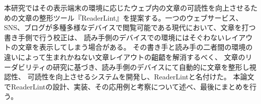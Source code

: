 \begin{jabstract}

	本研究ではその表示端末の環境に応じたウェブ内の文章の可読性を向上させるための文章の整形ツール『ReaderLint』を提案する。一つのウェブサービス、SNS、ブログが多種多様なデバイスで閲覧可能である現代において、文章を打つ書き手側で行う校正は、
    読み手側のデバイスでの環境にはそぐわないレイアウトの文章を表示してしまう場合がある。
    その書き手と読み手の二者間の環境の違いによって生まれかねない文章レイアウトの齟齬を解消するべく、
    文章のリーダビリティの研究に基づき、読み手側のデバイスにて自動的に文章を整形し視認性、
    可読性を向上させるシステムを開発し、ReaderLintと名付けた。
	本論文でReaderLintの設計、実装、その応用例と考察について述べ、最後にまとめを行う。

\end{jabstract}



